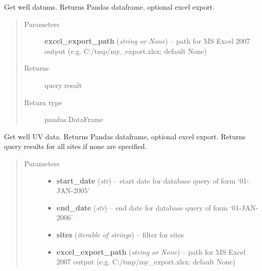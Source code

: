 \documentclass[letterpaper,10pt,english]{sphinxmanual}
\begin{document}
\begin{fulllineitems}

\begin{fulllineitems}
\label{modules:webb_utils.retrieve_data.RetrieveData.get_well_datums}
Get well datums. Returns Pandas dataframe, optional excel export.
\begin{quote}\begin{description}
\item[{Parameters}] \leavevmode
\textbf{excel\_export\_path} (\emph{string or None}) -- path for MS Excel 2007 output (e.g. C:/tmp/my\_export.xlsx; default None)

\item[{Returns}] \leavevmode
query result

\item[{Return type}] \leavevmode
pandas.DataFrame

\end{description}\end{quote}

\end{fulllineitems}


\begin{fulllineitems}
\label{modules:webb_utils.retrieve_data.RetrieveData.get_well_uvs}
Get well UV data. Returns Pandas dataframe, optional excel export.
Returns query results for all sites if none are specified.
\begin{quote}\begin{description}
\item[{Parameters}] \leavevmode\begin{itemize}
\item {} 
\textbf{start\_date} (\emph{str}) -- start date for database query of form `01-JAN-2005'

\item {} 
\textbf{end\_date} (\emph{str}) -- end date for database query of form `01-JAN-2006'

\item {} 
\textbf{sites} (\emph{iterable of strings}) -- filter for sites

\item {} 
\textbf{excel\_export\_path} (\emph{string or None}) -- path for MS Excel 2007 output (e.g. C:/tmp/my\_export.xlsx; default None)


\end{itemize}
\end{description}
\end{quote}
\end{fulllineitems}
\end{fulllineitems}
\end{document}
